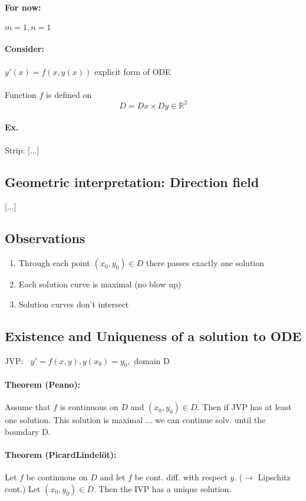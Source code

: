 \documentclass[twocolumn]{article}
\begin{document}
\paragraph{For now:}
$ m=1,n=1 $ 
\paragraph{Consider:}
$ y'(x)=f(x,y(x)) $ explicit form of ODE\\\\
Function $ f $ is defined on
\begin{equation}
D=Dx\times Dy\in\mathbb R ^{2}
\end{equation}
\paragraph{Ex.}
Strip: [...]
\subsection{Geometric interpretation: Direction field}
[...]
\subsection{Observations}
\begin{enumerate}
	\item Through each point $ (x_0,y_0)\in D $ there passes exactly one solution
	\item Each solution curve is maximal (no blow up)
	\item Solution curves don't intersect 
\end{enumerate}
\subsection{Existence and Uniqueness of a solution to ODE}
	JVP:$~~~~ y'=f(x,y),y(x_0)=y_0,$ domain D
	\paragraph{Theorem (Peano):}
	Assume that $f$ is continuous on $D$ and $(x_0,y_0)\in D$. Then if JVP has at least one solution. This solution is maximal ... we can continue solv. until the boundary D.
	\paragraph{Theorem (PicardLindelöt):}
	Let $f$ be continuous on $D$ and let $f$ be cont. diff. with respect $y$. ($\rightarrow$ Lipschitz cont.) Let $(x_0,y_0)\in D$. Then the IVP has a unique solution.
\end{document}
